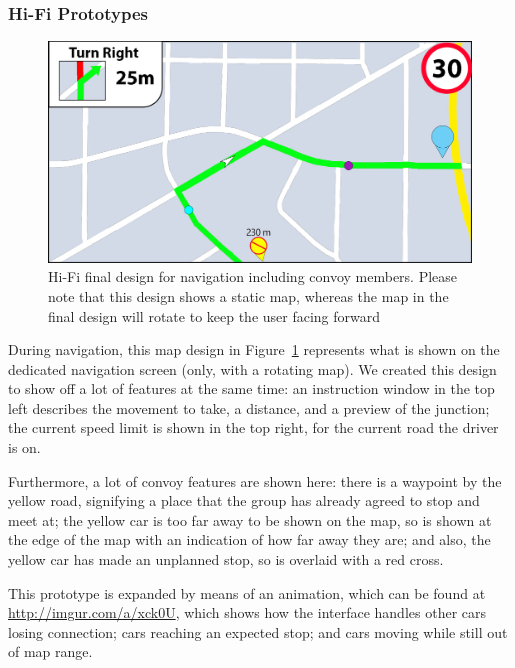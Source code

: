 \documentclass{article}
\begin{document}
\subsubsection{Hi-Fi Prototypes}
\begin{figure}[H]
  \centering
  \includegraphics[width=\linewidth]{convoy-map}
  \caption{Hi-Fi final design for navigation including convoy members. Please note that this design shows a static map, whereas the map in the final design will rotate to keep the user facing forward}\label{convoy-map}
\end{figure}
During navigation, this map design in Figure~\ref{convoy-map} represents what is shown on the dedicated navigation screen (only, with a rotating map). We created this design to show off a lot of features at the same time: an instruction window in the top left describes the movement to take, a distance, and a preview of the junction; the current speed limit is shown in the top right, for the current road the driver is on.

Furthermore, a lot of convoy features are shown here: there is a waypoint by the yellow road, signifying a place that the group has already agreed to stop and meet at; the yellow car is too far away to be shown on the map, so is shown at the edge of the map with an indication of how far away they are; and also, the yellow car has made an unplanned stop, so is overlaid with a red cross.

This prototype is expanded by means of an animation, which can be found at \url{http://imgur.com/a/xck0U}, which shows how the interface handles other cars losing connection; cars reaching an expected stop; and cars moving while still out of map range.

\end{document}
